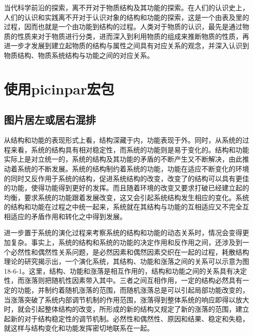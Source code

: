 \documentclass[UTF8]{ctexart}
\begin{document}
当代科学前沿的探索，离不开对于物质结构及其功能的探索。在人们的认识史上，人们的认识和实践离不开对于认识对象的结构和功能的探索，这是一个由表及里的过程，因而也就是一个由功能到结构的过程。人类对于物质的认识，最先是通过物质的性质来对于物质进行分类，进而深入到利用物质的组成来推断物质的性质，再进一步才发展到建立起物质的结构与属性之间具有对应关系的观念，并深入认识到物质结构、物质系统结构与功能之间的对应关系。


\section{使用picinpar宏包}


\subsection{图片居左或居右混排}
从结构和功能的表现形式上看，结构深藏于内，功能表现于外。同时，从系统的过程来看，系统的结构具有相对稳定性，而系统的功能则是易于变化的。结构和功能实际上是对立统一的，系统的结构及其功能的矛盾的不断产生又不断解决，由此推动着系统的不断发展。系统的结构制约着系统的功能，功能在适应不断变化的环境的同时又反作用于系统的结构，促进系统结构的改变，改变了的结构可以具有更佳的功能，使得功能得到更好的发挥。而且随着环境的改变又要求打破已经建立起的均衡，要求系统的功能跟着发展改变，这又会引起系统结构发生相应的变化。系统的结构和功能在过程之中统一起来，系统就在其结构与功能的互相适应又不完全互相适应的矛盾作用和转化之中得到发展。

\begin{window}
  进一步置于系统的演化过程来考察系统的结构和功能的动态关系时，情况会变得更加复杂。事实上，系统的结构和系统的功能的决定作用和反作用之间，还涉及到一个必然性和偶然性关系问题，是必然因素和偶然因素交织在一起的过程，耗散结构理论的研究揭示出，一个演化系统，其结构、功能和涨落之间的关系可以示意为图18-6-1。这里，结构、功能和涨落是相互作用的，结构和功能之间的关系具有决定性，而涨落则把随机性因素带入其中。三者之间互相作用，一定的结构必然具有一定的功能，并制约着随机涨落的范围，而随机涨落总是可以引起局部功能改变的，当涨落突破了系统内部调节机制的作用范围，涨落得到整体系统的响应即得以放大时，就会引起整体结构的改变，所形成的新的结构又规定了新的涨落的范围，建立起新的对于结构稳定性的调节机制。必然性和偶然性、原因和结果、稳定和失稳，就这样与结构变化和功能发挥密切地联系在一起。
\end{window}
\end{document}
